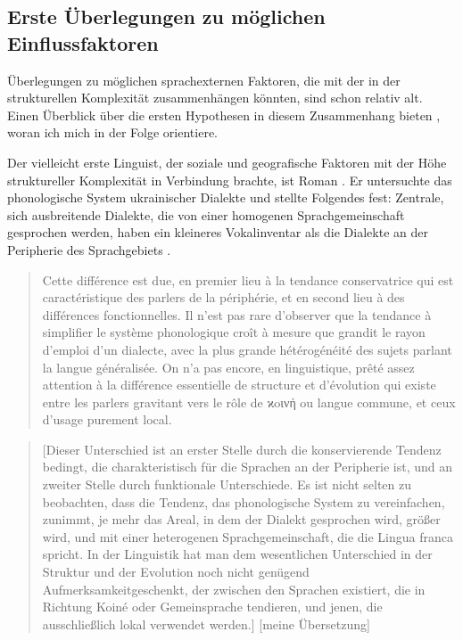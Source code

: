 \subsection{Erste Überlegungen zu möglichen Einflussfaktoren}\label{2.2.1}

Überlegungen zu möglichen sprachexternen Faktoren, die mit der  in der strukturellen Komplexität zusammenhängen könnten, sind schon relativ alt. Einen Überblick über die ersten Hypothesen in diesem Zusammenhang bieten \citet{BaechlerSeiler2016a}, woran ich mich in der Folge orientiere.

Der vielleicht erste Linguist, der soziale und geografische Faktoren mit der Höhe struktureller Komplexität in Verbindung brachte, ist Roman \citet{Jakobson1929}. Er untersuchte das phonologische System ukrainischer Dialekte und stellte Folgendes fest: Zentrale, sich ausbreitende Dialekte, die von einer homogenen Sprachgemeinschaft gesprochen werden, haben ein kleineres Vokalinventar als die Dialekte an der Peripherie des Sprachgebiets \citep[73]{Jakobson1929}.

\begin{quote}
Cette différence est due, en premier lieu à la tendance conservatrice qui est caractéristique des parlers de la périphérie, et en second lieu à des différences fonctionnelles. Il n’est pas rare d’observer que la tendance à simplifier le système phonologique croît à mesure que grandit le rayon d’emploi d’un dialecte, avec la plus grande hétérogénéité des sujets parlant la langue généralisée. On n’a pas encore, en linguistique, prêté assez attention à la différence essentielle de structure et d’évolution qui existe entre les parlers gravitant vers le rôle de ϰoɩν\'η ou langue commune, et ceux d’usage purement local. \citep[73]{Jakobson1929}
\end{quote}

\begin{quote}
[Dieser Unterschied ist an erster Stelle durch die konservierende Tendenz bedingt, die charakteristisch für die Sprachen an der Peripherie ist, und an zweiter Stelle durch funktionale Unterschiede. Es ist nicht selten zu beobachten, dass die Tendenz, das phonologische System zu vereinfachen, zunimmt, je mehr das Areal, in dem der Dialekt gesprochen wird, größer wird, und mit einer heterogenen Sprachgemeinschaft, die die Lingua franca spricht. In der Linguistik hat man dem wesentlichen Unterschied in der Struktur und der Evolution noch nicht genügend Aufmerksamkeit\linebreak geschenkt, der zwischen den Sprachen existiert, die in Richtung Koiné oder Gemeinsprache tendieren, und jenen, die ausschließlich lokal verwendet werden.] [meine Übersetzung]
\end{quote}

